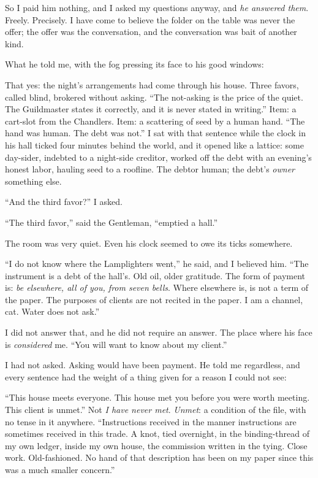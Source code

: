 So I paid him nothing, and I asked my questions anyway, and \emph{he answered them}. Freely. Precisely. I have come to believe the folder on the table was never the offer; the offer was the conversation, and the conversation was bait of another kind.

What he told me, with the fog pressing its face to his good windows:

That yes: the night's arrangements had come through his house. Three favors, called blind, brokered without asking. ``The not-asking is the price of the quiet. The Guildmaster states it correctly, and it is never stated in writing.'' Item: a cart-slot from the Chandlers. Item: a scattering of seed by a human hand. ``The hand was human. The debt was not.'' I sat with that sentence while the clock in his hall ticked four minutes behind the world, and it opened like a lattice: some day-sider, indebted to a night-side creditor, worked off the debt with an evening's honest labor, hauling seed to a roofline. The debtor human; the debt's \emph{owner} something else.

``And the third favor?'' I asked.

``The third favor,'' said the Gentleman, ``emptied a hall.''

The room was very quiet. Even his clock seemed to owe its ticks somewhere.

``I do not know where the Lamplighters went,'' he said, and I believed him. ``The instrument is a debt of the hall's. Old oil, older gratitude. The form of payment is: \emph{be elsewhere, all of you, from seven bells}. Where elsewhere is, is not a term of the paper. The purposes of clients are not recited in the paper. I am a channel, cat. Water does not ask.''

I did not answer that, and he did not require an answer. The place where his face is \emph{considered} me. ``You will want to know about my client.''

I had not asked. Asking would have been payment. He told me regardless, and every sentence had the weight of a thing given for a reason I could not see:

``This house meets everyone. This house met you before you were worth meeting. This client is unmet.'' Not \emph{I have never met}. \emph{Unmet}: a condition of the file, with no tense in it anywhere. ``Instructions received in the manner instructions are sometimes received in this trade. A knot, tied overnight, in the binding-thread of my own ledger, inside my own house, the commission written in the tying. Close work. Old-fashioned. No hand of that description has been on my paper since this was a much smaller concern.''

